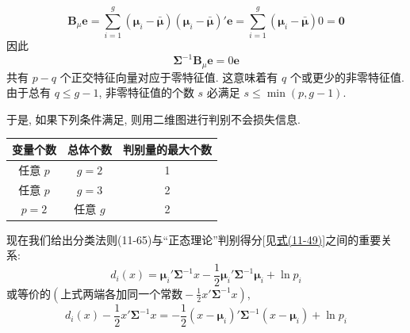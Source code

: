 
\[
\mathbf{B}_\mu\mathbf{e}=\sum_{i=1}^{g}(\boldsymbol{\mu}_i-\bar{\boldsymbol{\mu}})(\boldsymbol{\mu}_i-\bar{\boldsymbol{\mu}})'\mathbf{e}=\sum_{i=1}^{g}(\boldsymbol{\mu}_i-\bar{\boldsymbol{\mu}})0=\mathbf{0}
\]
因此
\[
\boldsymbol{\Sigma}^{-1}\mathbf{B}_\mu\mathbf{e}=0\mathbf{e}
\]
共有 $p-q$ 个正交特征向量对应于零特征值. 这意味着有 $q$ 个或更少的非零特征值. 由于总有 $q\le g-1$, 非零特征值的个数 $s$ 必满足 $s\le\min(p,g-1)$.

于是, 如果下列条件满足, 则用二维图进行判别不会损失信息.

\begin{mvtable}
\begin{tabular}{c|c|c}
\toprule
变量个数 & 总体个数 & 判别量的最大个数 \\
\midrule
任意 $p$ & $g=2$ & 1 \\
任意 $p$ & $g=3$ & 2 \\
$p=2$ & 任意 $g$ & 2 \\
\bottomrule
\end{tabular}
\end{mvtable}

现在我们给出分类法则(11-65)与“正态理论”判别得分[见\hyperref[eq:11-49]{式(11-49)}]之间的重要关系:
\[
d_i(x)=\boldsymbol{\mu}_i'\boldsymbol{\Sigma}^{-1}x-\frac{1}{2}\boldsymbol{\mu}_i'\boldsymbol{\Sigma}^{-1}\boldsymbol{\mu}_i+\ln p_i
\]
或等价的$\left(\text{上式两端各加同一个常数}-\frac{1}{2}x'\boldsymbol{\Sigma}^{-1}x\right)$,
\[
d_i(x)-\frac{1}{2}x'\boldsymbol{\Sigma}^{-1}x=-\frac{1}{2}(x-\boldsymbol{\mu}_i)'\boldsymbol{\Sigma}^{-1}(x-\boldsymbol{\mu}_i)+\ln p_i
\]

